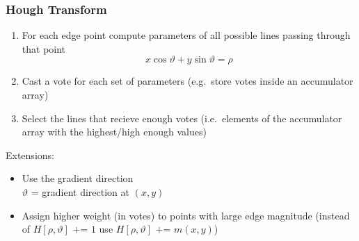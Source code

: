 \documentclass{article}
\begin{document}
        \subsubsection{Hough Transform}
        \begin{enumerate}
            \item For each edge point compute parameters of all possible lines passing through that point
            \[
                x \cos{\vartheta} + y \sin{\vartheta} = \rho
            \]
            \item Cast a vote for each set of parameters (e.g.\ store votes inside an accumulator array)
            \item Select the lines that recieve enough votes (i.e.\ elements of the accumulator array with the highest/high enough values)
        \end{enumerate}
        Extensions:
        \begin{itemize}
            \item Use the gradient direction \\
                  $\vartheta$ = gradient direction at $(x, y)$
            \item Assign higher weight (in votes) to points with large edge magnitude
                  (instead of $H[\rho, \vartheta] \text{ += } 1$ use $H[\rho, \vartheta] \text{ += } m(x, y)$)
        \end{itemize}
        
\end{document}
